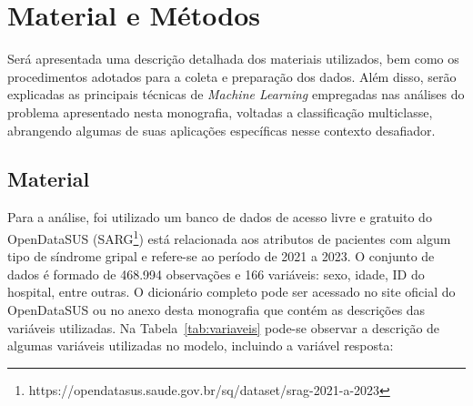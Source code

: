 \documentclass[12pt,oneside,a4paper,chapter=TITLE,
			   english,brazil]{abntex2}
\begin{document}
\vspace{\onelineskip}
\textual
\chapter{Material e Métodos}

Será apresentada uma descrição detalhada dos materiais utilizados, bem como os procedimentos adotados para a coleta e preparação dos dados. Além disso, serão explicadas as principais técnicas de \textit{Machine Learning} empregadas nas análises do problema apresentado nesta monografia, voltadas a classificação multiclasse, abrangendo  algumas de suas aplicações específicas nesse contexto desafiador.



\section{Material}

Para a análise, foi utilizado um banco de dados de acesso livre e gratuito do OpenDataSUS (SARG\footnote[1]{https://opendatasus.saude.gov.br/sq/dataset/srag-2021-a-2023}) está relacionada aos atributos de  pacientes  com algum tipo de síndrome gripal e refere-se ao período de 2021 a 2023. O conjunto de dados é formado de 468.994 observações e 166 variáveis: sexo, idade, ID do hospital, entre outras. O dicionário completo pode ser acessado  no site oficial do OpenDataSUS ou no anexo desta monografia que contém as descrições das variáveis utilizadas.   Na Tabela~\ref{tab:variaveis} pode-se observar a descrição de algumas variáveis utilizadas no modelo, incluindo a variável resposta:

\pagestyle{plain}
\end{document}
